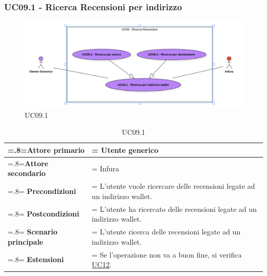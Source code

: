         \subsubsection{UC09.1 - Ricerca Recensioni per indirizzo}
        \label{UC09.1}

            \begin{figure}[H]
                \centering
                \includegraphics[scale=0.6]{src/img/UC09.1.png}
                \caption{UC09.1}
            \end{figure}

            \begin{table}[H]
                \centering
                \renewcommand{\arraystretch}{1.8}
                \renewcommand\tabularxcolumn[1]{m{#1}}
                \begin{tabularx}{0.9\textwidth} {
                    >{\hsize=.8\hsize\linewidth=\hsize}X
                    >{\hsize=1.2\hsize\linewidth=\hsize}X}
                    \hline
                    \textbf{Attore primario} & Utente generico \\
                    \hline
                    \textbf{Attore secondario} & Infura \\
                    \hline
                    \textbf{Precondizioni} & L'utente vuole ricercare delle recensioni legate ad un indirizzo wallet. \\
                    \hline
                    \textbf{Postcondizioni} & L'utente ha ricercato delle recensioni legate ad un indirizzo wallet. \\
                    \hline
                    \textbf{Scenario principale} & L'utente ricerca delle recensioni legate ad un indirizzo wallet.\\
                    \hline
                    \textbf{Estensioni} & Se l'operazione non va a buon fine, si verifica \hyperref[UC12]{UC12}. \\
                    \hline
                \end{tabularx}
                \caption{UC09.1}
            \end{table}


